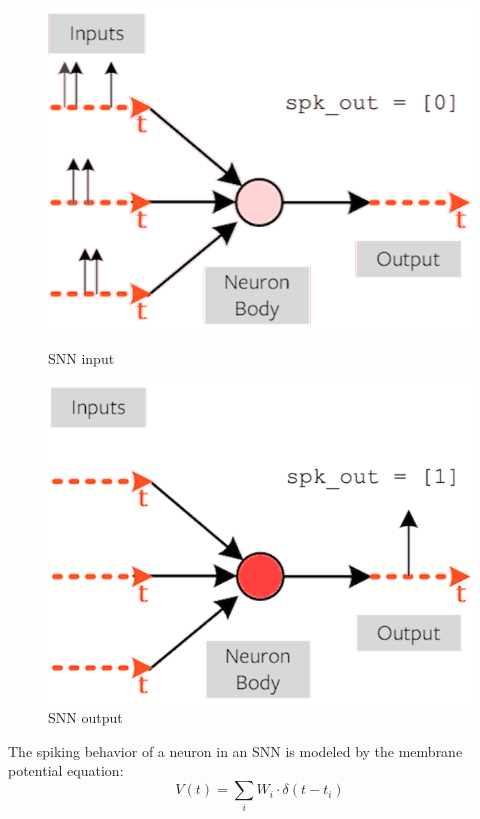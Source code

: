 \documentclass[11pt]{article}
\begin{document}
\begin{figure}[h]
  \centering
  \begin{minipage}{0.45\textwidth}
    \centering
    \includegraphics[width=1\textwidth]{image/def1.png}
    \caption{SNN input}
  \end{minipage}\hfill
  \begin{minipage}{0.45\textwidth}
    \centering
    \includegraphics[width=1\textwidth]{image/def2.png}
    \caption{SNN output}
  \end{minipage}
\end{figure}


The spiking behavior of a neuron in an SNN is modeled by the membrane potential equation:
$$
  V(t) = \sum_{i} W_i \cdot \delta(t - t_i)
$$
\end{document}
